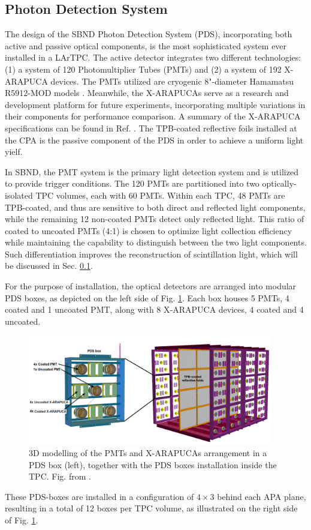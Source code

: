 \subsection{Photon Detection System}

The design of the SBND Photon Detection System (PDS), incorporating both active and passive optical components, is the most sophisticated system ever installed in a LArTPC. 
The active detector integrates two different technologies: (1) a system of 120 Photomultiplier Tubes (PMTs) and (2) a system of 192 X-ARAPUCA devices.
The PMTs utilized are cryogenic 8"-diameter Hamamatsu R5912-MOD models \cite{hamamatsu}. 
Meanwhile, the X-ARAPUCAs serve as a research and development platform for future experiments, incorporating multiple variations in their components for performance comparison. 
A summary of the X-ARAPUCA specifications can be found in Ref. \cite{}.
The TPB-coated reflective foils installed at the CPA is the passive component of the PDS in order to achieve a uniform light yielf.

In SBND, the PMT system is the primary light detection system and is utilized to provide trigger conditions. 
The 120 PMTs are partitioned into two optically-isolated TPC volumes, each with 60 PMTs.
Within each TPC, 48 PMTs are TPB-coated, and thus are sensitive to both direct and reflected light components, while the remaining 12 non-coated PMTs detect only reflected light. 
This ratio of coated to uncoated PMTs (4:1) is chosen to optimize light collection efficiency while maintaining the capability to distinguish between the two light components. 
Such differentiation improves the reconstruction of scintillation light, which will be discussed in Sec. \ref{}.

For the purpose of installation, the optical detectors are arranged into modular PDS boxes, as depicted on the left side of Fig. \ref{fig:SBND_PDS}. 
Each box houses 5 PMTs, 4 coated and 1 uncoated PMT, along with 8 X-ARAPUCA devices, 4 coated and 4 uncoated.
\begin{figure}[hbp] 
\centering    
\includegraphics[width=0.95\textwidth]{SBND_PDS}
\caption[SBND_PDS]{
3D modelling of the PMTs and X-ARAPUCAs arrangement in a PDS box (left), together with the PDS boxes installation inside the TPC.
Fig. from \cite{}.
}
\label{fig:SBND_PDS}
\end{figure}
These PDS-boxes are installed in a configuration of $4 \times 3$ behind each APA plane, resulting in a total of 12 boxes per TPC volume, as illustrated on the right side of Fig. \ref{fig:SBND_PDS}.

